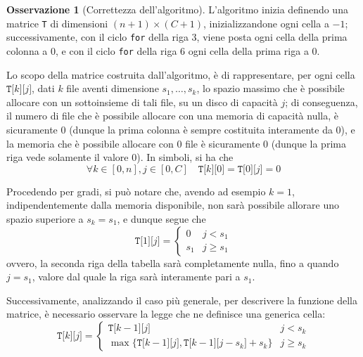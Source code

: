 \documentclass[14pt]{extreport}
\theoremstyle{definition}
\theoremstyle{definition}
\newtheorem{remark}{Osservazione}[subsection]
\begin{document}
\begin{remark}[Correttezza dell'algoritmo]
    L'algoritmo inizia definendo una matrice \texttt{T} di dimensioni $(n + 1) \times (C + 1)$, inizializzandone ogni cella a $-1$; successivamente, con il ciclo \texttt{for} della riga 3, viene posta ogni cella della prima colonna a 0, e con il ciclo \texttt{for} della riga 6 ogni cella della prima riga a 0.

    Lo scopo della matrice costruita dall'algoritmo, è di rappresentare, per ogni cella $\texttt{T[}k\texttt{][}j\texttt{]}$, dati $k$ file aventi dimensione $s_1, \ldots, s_k$, lo spazio massimo che è possibile allocare con un sottoinsieme di tali file, su un disco di capacità $j$; di conseguenza, il numero di file che è possibile allocare con una memoria di capacità nulla, è sicuramente 0 (dunque la prima colonna è sempre costituita interamente da 0), e la memoria che è possibile allocare con 0 file è sicuramente 0 (dunque la prima riga vede solamente il valore 0). In simboli, si ha che $$\forall k \in [0, n], j \in [0, C] \quad \texttt{T[}k\texttt{][}0\texttt{]} = \texttt{T[}0\texttt{][}j\texttt{]} = 0$$

    Procedendo per gradi, si può notare che, avendo ad esempio $k = 1$, indipendentemente dalla memoria disponibile, non sarà possibile allorare uno spazio superiore a $s_k = s_1$, e dunque segue che $$\texttt{T[}1\texttt{][}j\texttt{]}= \left \{ \begin{array}{ll} 0 & j < s_1 \\ s_1 & j \ge s_1 \end{array} \right.$$ ovvero, la seconda riga della tabella sarà completamente nulla, fino a quando $j = s_1$, valore dal quale la riga sarà interamente pari a $s_1$.

    Successivamente, analizzando il caso più generale, per descrivere la funzione della matrice, è necessario osservare la legge che ne definisce una generica cella: $$\texttt{T[}k\texttt{][}j\texttt{]}=\left \{ \begin{array}{ll}\texttt{T[}k - 1\texttt{][}j\texttt{]} & j < s_k \\ \max\{\texttt{T[}k - 1\texttt{][}j\texttt{]}, \texttt{T[}k-1\texttt{][}j - s_k\texttt{]} + s_k\} & j \ge s_k \end{array} \right.$$


\end{remark}
\end{document}
